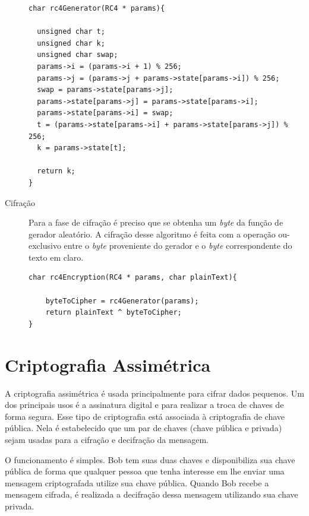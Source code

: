 \begin{description}
    \begin{lstlisting}[caption={Código Geração Aleatório de \textit{bytes}}, label=randomGeneration]
char rc4Generator(RC4 * params){

  unsigned char t;
  unsigned char k;
  unsigned char swap;
  params->i = (params->i + 1) % 256;
  params->j = (params->j + params->state[params->i]) % 256;
  swap = params->state[params->j];
  params->state[params->j] = params->state[params->i];
  params->state[params->i] = swap;
  t = (params->state[params->i] + params->state[params->j]) % 256;
  k = params->state[t];

  return k;
}
    \end{lstlisting}

	\item [Cifração] Para a fase de cifração é preciso que se obtenha um \textit{byte} da função de gerador aleatório. A cifração desse algoritmo é feita com a operação ou-exclusivo entre o \textit{byte} proveniente do gerador e o \textit{byte} correspondente do texto em claro.

    \begin{lstlisting}[caption={Código Cifração de \textit{bytes}}, label=encryption]
char rc4Encryption(RC4 * params, char plainText){

	byteToCipher = rc4Generator(params);
	return plainText ^ byteToCipher;
}
    \end{lstlisting}

\end{description}


%
\section{Criptografia Assimétrica}
\label{assymmetric-cryptography}

%
A criptografia assimétrica é usada principalmente para cifrar dados pequenos. Um dos principais usos é a assinatura digital e para realizar a troca de chaves de forma segura. Esse tipo de criptografia está associada à criptografia de chave pública. Nela é estabelecido que um par de chaves (chave pública e privada) sejam usadas para a cifração e decifração da mensagem. 

%
O funcionamento é simples. Bob tem suas duas chaves e disponibiliza sua chave pública de forma que qualquer pessoa que tenha interesse em lhe enviar uma mensagem criptografada utilize sua chave pública. Quando Bob recebe a mensagem cifrada, é realizada a decifração dessa mensagem utilizando sua chave privada.

